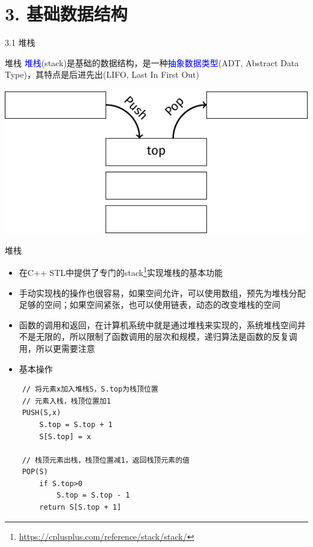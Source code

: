 


\frame{\titlepage}
\section{3. 基础数据结构}
\begin{frame}{3.1 堆栈}
    \begin{block}{堆栈}
        \textcolor{blue}{堆栈}(stack)是基础的数据结构，是一种\textcolor{blue}{抽象数据类型}(ADT, Abstract Data Type)，其特点是后进先出(LIFO, Last In First Out)
    \end{block}
    \vfill
    \includegraphics[center]{fig/3-1.pdf}
\end{frame}
\begin{frame}{堆栈}
    \begin{itemize}
        \item 在C++ STL中提供了专门的stack\footnote{\url{https://cplusplus.com/reference/stack/stack/}}实现堆栈的基本功能
        \vfill
        \item 手动实现栈的操作也很容易，如果空间允许，可以使用数组，预先为堆栈分配足够的空间；如果空间紧张，也可以使用链表，动态的改变堆栈的空间
        \vfill
        \item 函数的调用和返回，在计算机系统中就是通过堆栈来实现的，系统堆栈空间并不是无限的，所以限制了函数调用的层次和规模，递归算法是函数的反复调用，所以更需要注意
    \end{itemize}
\end{frame}
\vspace*{8ex}
\begin{itemize}
    \item[] \Large{基本操作}
\end{itemize}
\begin{lstlisting}
    // 将元素x加入堆栈S，S.top为栈顶位置
    // 元素入栈，栈顶位置加1
    PUSH(S,x) 
        S.top = S.top + 1 
        S[S.top] = x

    // 栈顶元素出栈，栈顶位置减1，返回栈顶元素的值
    POP(S) 
        if S.top>0
            S.top = S.top - 1
        return S[S.top + 1]
\end{lstlisting}
